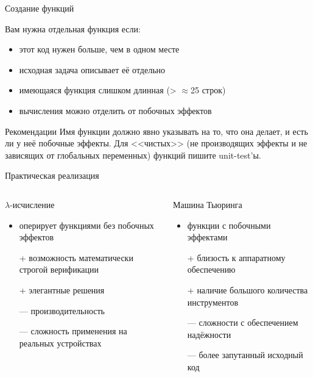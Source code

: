 \documentclass[t]{beamer}
\begin{document}
\begin{frame}{Создание функций}
  \begin{block}{Вам нужна отдельная функция если:}
    \begin{itemize}
    \item этот код нужен больше, чем в одном месте
    \item исходная задача описывает её отдельно
    \item имеющаяся функция слишком длинная (> $\approx$25 строк)
    \item вычисления можно отделить от побочных эффектов
    \end{itemize}
  \end{block}

  \begin{block}{Рекомендации}
Имя функции должно явно указывать на то, что она делает, и есть ли у
неё побочные эффекты. Для <<чистых>> (не производящих эффекты и не
зависящих от глобальных переменных) функций пишите unit-test'ы.
  \end{block}
\end{frame}

\begin{frame}{Практическая реализация}
  \begin{columns}
    \begin{block}{$\lambda$-исчисление}
      \begin{itemize}
      \item оперирует функциями без побочных эффектов
      \item[+] возможность математически строгой верификации
      \item[+] элегантные решения
      \item[---] производительность
      \item[---] сложность применения на реальных устройствах
      \end{itemize}
    \end{block}

    \begin{block}{Машина Тьюринга}
      \begin{itemize}
      \item функции с побочными эффектами
      \item [+] близость к аппаратному обеспечению
      \item [+] наличие большого количества инструментов
      \item [---] сложности с обеспечением надёжности
      \item [---] более запутанный исходный код
      \end{itemize}
    \end{block}
    
  \end{columns}
\end{frame}
\end{document}
